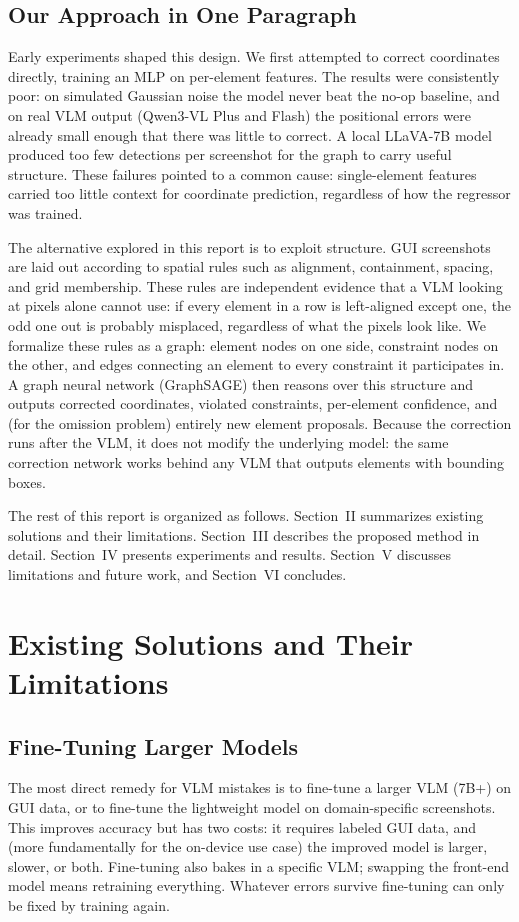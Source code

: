 \documentclass[11pt, letterpaper]{article}
\begin{document}
\subsection{Our Approach in One Paragraph}
Early experiments shaped this design. We first attempted to correct
coordinates directly, training an MLP on per-element features. The results
were consistently poor: on simulated Gaussian noise the model never beat the
no-op baseline, and on real VLM output (Qwen3-VL Plus and Flash) the
positional errors were already small enough that there was little to correct.
A local LLaVA-7B model produced too few detections per screenshot for the
graph to carry useful structure. These failures pointed to a common cause:
single-element features carried too little context for coordinate
prediction, regardless of how the regressor was trained.

The alternative explored in this report is to exploit structure. GUI
screenshots are laid out according to spatial rules such as alignment,
containment, spacing, and grid membership. These rules are independent
evidence that a VLM looking at pixels alone cannot use: if every element in
a row is left-aligned except one, the odd one out is probably misplaced,
regardless of what the pixels look like. We formalize these rules as a graph:
element nodes on one side, constraint nodes on the other, and edges connecting
an element to every constraint it participates in. A graph neural network
(GraphSAGE) then reasons over this structure and outputs corrected
coordinates, violated constraints, per-element confidence, and (for the
omission problem) entirely new element proposals. Because the correction
runs after the VLM, it does not modify the underlying model: the same
correction network works behind any VLM that outputs elements with bounding
boxes.

The rest of this report is organized as follows. Section~II summarizes
existing solutions and their limitations. Section~III describes the proposed
method in detail. Section~IV presents experiments and results. Section~V
discusses limitations and future work, and Section~VI concludes.

\section{Existing Solutions and Their Limitations}
\subsection{Fine-Tuning Larger Models}
The most direct remedy for VLM mistakes is to fine-tune a larger VLM (7B+) on
GUI data, or to fine-tune the lightweight model on domain-specific screenshots.
This improves accuracy but has two costs: it requires labeled GUI data, and
(more fundamentally for the on-device use case) the improved model is
larger, slower, or both. Fine-tuning also bakes in a specific VLM; swapping
the front-end model means retraining everything. Whatever errors survive
fine-tuning can only be fixed by training again.
\end{document}
